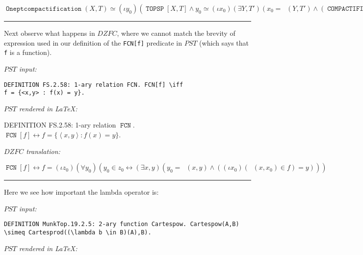 \documentclass{llncs}
\newcommand{\myrule}{\noindent \rule{\textwidth}{0.3mm}}
\newcommand{\na}[1]{\mathit{#1}}    \newcommand{\fn}[1]{\mathit{#1}}    \newcommand{\ax}[1]{\mathit{(#1)}}  \newcommand{\mdl}[1]{\mathcal{#1}}
\newcommand{\seq}[1]{\left\langle #1 \right\rangle}
\newcommand{\less}{\backslash}
\begin{document}
\medskip
\noindent $\mathop{\mathtt{Oneptcompactification}}(X,T) \simeq (\iota
y_{0})(\mathop{\mathtt{TOPSP}}[X,T] \wedge y_{0} \simeq (\iota x_{0})(\exists
Y,T')(x_{0} = \mathop{\mathtt{\varpi_{0}}}(Y,T') \wedge
(\mathop{\mathtt{COMPACTIFICATION}}[Y,T',X,T] \wedge
\mathop{\mathtt{\approx_{C}}}[\mathop{\mathtt{\less}}(Y,X),\mathop{\mathtt{1_{N}}}])))$

\myrule

\medskip
{} Next observe what happens in $\na{DZFC}$,
where we cannot match the brevity of expression used in our definition
of the {\tt FCN[f]} predicate in $\na{PST}$ (which says that {\tt f}
is a function).

\bigskip
\noindent \emph{$\na{PST}$ input:}

\vspace{-2mm}

\begin{verbatim}
DEFINITION FS.2.58: 1-ary relation FCN. FCN[f] \iff
f = {<x,y> : f(x) = y}.
\end{verbatim}

\noindent  \emph{$\na{PST}$ rendered in \LaTeX{}:}

\medskip
\noindent DEFINITION FS.2.58: 1-ary relation $\mathop{\mathtt{FCN}}$.
$\mathop{\mathtt{FCN}}[f] \leftrightarrow f = \lbrace \seq{x,y} : f(x) = y
\rbrace $.

\bigskip

\noindent \emph{$\na{DZFC}$ translation:}

\medskip
\noindent $\mathop{\mathtt{FCN}}[f] \leftrightarrow f = (\iota z_{0})(\forall y_{0})(y_{0}
\in z_{0} \leftrightarrow (\exists x,y)(y_{0} =
\mathop{\mathtt{\varpi_{0}}}(x,y) \wedge ((\iota
x_{0})(\mathop{\mathtt{\varpi_{0}}}(x,x_{0}) \in f) = y)))$

\myrule

\medskip

 Here we see how important the lambda operator is:

\medskip
\noindent \emph{$\na{PST}$ input:}

\vspace{-2mm}

\begin{verbatim}
DEFINITION MunkTop.19.2.5: 2-ary function Cartespow. Cartespow(A,B)
\simeq Cartesprod((\lambda b \in B)(A),B).
\end{verbatim}

\noindent \emph{$\na{PST}$ rendered in \LaTeX{}:}
\end{document}
